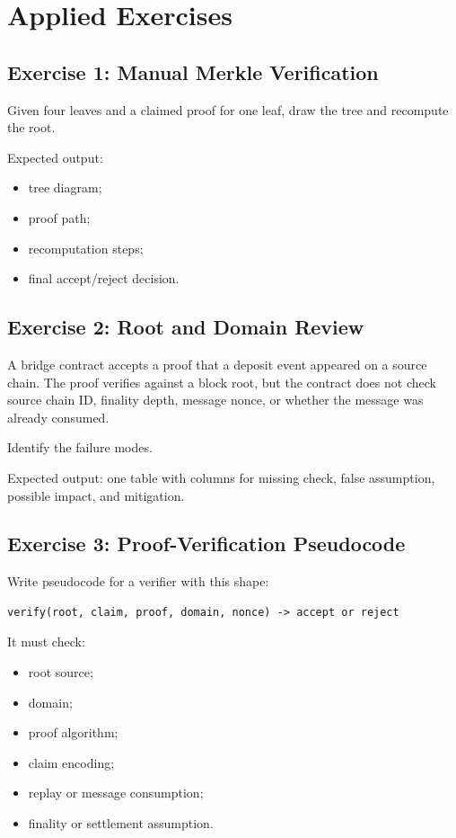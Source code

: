 \section{Applied Exercises}

\subsection{Exercise 1: Manual Merkle Verification}

Given four leaves and a claimed proof for one leaf, draw the tree and recompute the root.

Expected output:

\begin{itemize}
\tightlist
\item
  tree diagram;
\item
  proof path;
\item
  recomputation steps;
\item
  final accept/reject decision.
\end{itemize}

\subsection{Exercise 2: Root and Domain Review}

A bridge contract accepts a proof that a deposit event appeared on a source chain. The proof verifies against a block root, but the contract does not check source chain ID, finality depth, message nonce, or whether the message was already consumed.

Identify the failure modes.

Expected output: one table with columns for missing check, false assumption, possible impact, and mitigation.

\subsection{Exercise 3: Proof-Verification Pseudocode}

Write pseudocode for a verifier with this shape:

\begin{lstlisting}
verify(root, claim, proof, domain, nonce) -> accept or reject
\end{lstlisting}

It must check:

\begin{itemize}
\tightlist
\item
  root source;
\item
  domain;
\item
  proof algorithm;
\item
  claim encoding;
\item
  replay or message consumption;
\item
  finality or settlement assumption.
\end{itemize}

